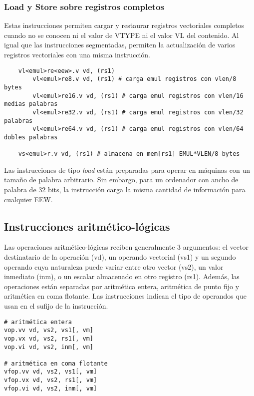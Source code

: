 \subsubsection{Load y Store sobre registros completos}

Estas instrucciones permiten cargar y restaurar registros vectoriales
completos cuando no se conocen ni el valor de VTYPE ni el valor VL del
contenido. Al igual que las instrucciones segmentadas, permiten la
actualización de varios registros vectoriales con una misma instrucción.

\begin{lstlisting}
    vl<emul>re<eew>.v vd, (rs1)
        vl<emul>re8.v vd, (rs1) # carga emul registros con vlen/8 bytes
        vl<emul>re16.v vd, (rs1) # carga emul registros con vlen/16 medias palabras
        vl<emul>re32.v vd, (rs1) # carga emul registros con vlen/32 palabras
        vl<emul>re64.v vd, (rs1) # carga emul registros con vlen/64 dobles palabras

    vs<emul>r.v vd, (rs1) # almacena en mem[rs1] EMUL*VLEN/8 bytes
\end{lstlisting}

Las instrucciones de tipo \textit{load} están preparadas para operar en
máquinas con un tamaño de palabra arbitrario. Sin embargo, para un ordenador
con ancho de palabra de 32 bits, la instrucción carga la misma cantidad de
información para cualquier EEW.

\subsection{Instrucciones aritmético-lógicas}

Las operaciones aritmético-lógicas reciben generalmente 3 argumentos: el vector
destinatario de la operación (vd), un operando vectorial (vs1) y un segundo
operando cuya naturaleza puede variar entre otro vector (vs2), un valor
inmediato (inm), o un escalar almacenado en otro registro (rs1). Además, las
operaciones están separadas por aritmética entera, aritmética de punto fijo y
aritmética en coma flotante. Las instrucciones indican el tipo de operandos que
usan en el sufijo de la instrucción.

\begin{lstlisting}
# aritmética entera
vop.vv vd, vs2, vs1[, vm]
vop.vx vd, vs2, rs1[, vm]
vop.vi vd, vs2, inm[, vm]

# aritmética en coma flotante
vfop.vv vd, vs2, vs1[, vm]
vfop.vx vd, vs2, rs1[, vm]
vfop.vi vd, vs2, inm[, vm]
\end{lstlisting}

